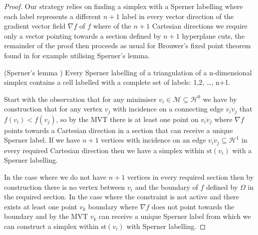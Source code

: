\begin{proof}
Our strategy relies on finding a simplex with a Sperner labelling where each label represents a different $n + 1$ label in every vector direction of the gradient vector field $\nabla f$ of $f$ where of the $n + 1$ Cartesian directions we require only a vector pointing towards a section defined by $n + 1$ hyperplane cuts, the remainder of the proof then proceeds as usual for Brouwer's fixed point theorem \citep{Brouwer1911} found in for example \citet[p. 40]{Henle1979} utilising Sperner's lemma.

\begin{theorem} (Sperner's lemma \citep{Sperner1928}) Every Sperner labelling of a triangulation of a n-dimensional simplex contains a cell labelled with a complete set of labels:  {1,2, \dots, n+1}.
\end{theorem}

Start with the observation that for any minimiser $v_i \in \mathcal{M} \subseteq \mathcal{H}^0$ we have by construction that for any vertex $v_j$ with incidence on a connecting edge $\overline{v_i v_j}$ that $f(v_i) < f(v_j)$, so by the MVT there is at least one point on $\overline{v_i v_j}$ where $\nabla f$ points towards a Cartesian direction in a section that can receive a unique Sperner label. If we have $n+1$ vertices with incidence on an edge $ \overline{v_i v_j}\subseteq \mathcal{H}^1$ in every required Cartesian direction then we have a simplex within $\textrm{st}\left( v_i \right)$ with a Sperner labelling. 

In the case where we do not have $n+1$ vertices in every required section then by construction there is no vertex between $v_i$ and the boundary of $f$ defined by $\Omega$ in the required section. In the case where the constraint is not active and there exists at least one point $v_k$ boundary where $\nabla f$ does not point towards the boundary and by the MVT $v_k$ can receive a unique Sperner label from which we can construct a simplex within $\textrm{st}\left( v_i \right)$ with Sperner labelling.


\end{proof}

